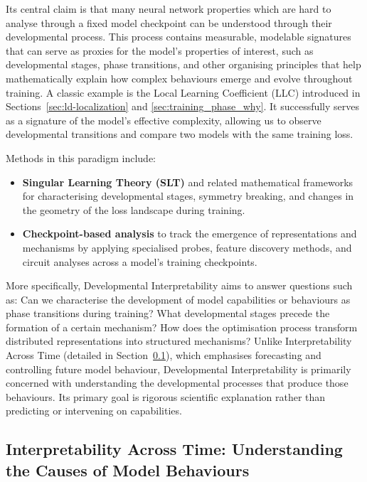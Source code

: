 Its central claim is that many neural network properties which are hard to analyse through a fixed model checkpoint can be understood through their developmental process. This process contains measurable, modelable signatures that can serve as proxies for the model’s properties of interest, such as developmental stages, phase transitions, and other organising principles that help mathematically explain how complex behaviours emerge and evolve throughout training. A classic example is the Local Learning Coefficient (LLC) introduced in Sections~\ref{sec:ld-localization} and \ref{sec:training_phase_why}. It successfully serves as a signature of the model’s effective complexity, allowing us to observe developmental transitions and compare two models with the same training loss.

Methods in this paradigm include:
\begin{itemize}
\item \textbf{Singular Learning Theory (SLT)} and related mathematical frameworks for characterising developmental stages, symmetry breaking, and changes in the geometry of the loss landscape during training.
\item \textbf{Checkpoint-based analysis} to track the emergence of representations and mechanisms by applying specialised probes, feature discovery methods, and circuit analyses across a model's training checkpoints.
\end{itemize}

More specifically, Developmental Interpretability aims to answer questions such as: Can we characterise the development of model capabilities or behaviours as phase transitions during training? What developmental stages precede the formation of a certain mechanism? How does the optimisation process transform distributed representations into structured mechanisms? Unlike Interpretability Across Time (detailed in Section~\ref{subsec: iat}), which emphasises forecasting and controlling future model behaviour, Developmental Interpretability is primarily concerned with understanding the developmental processes that produce those behaviours. Its primary goal is rigorous scientific explanation rather than predicting or intervening on capabilities.

\subsection{Interpretability Across Time: Understanding the Causes of Model Behaviours}
\label{subsec: iat}


